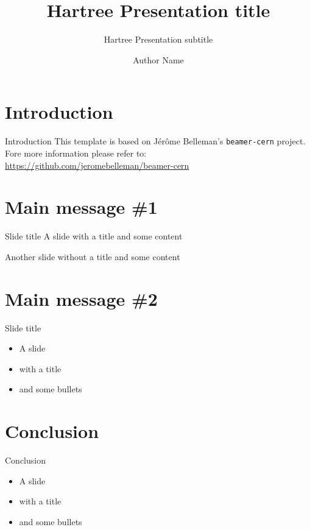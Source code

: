 \documentclass{beamer}
\author{Author Name}
\title{Hartree Presentation title}
\subtitle{Hartree Presentation subtitle}
\begin{document}
\frontcover

\frame{\titlepage}

\frame{\tableofcontents}

\section{Introduction}

\begin{frame}{Introduction}
This template is based on Jérôme Belleman's \texttt{beamer-cern} project. Fore more information please refer to: \small{\url{https://github.com/jeromebelleman/beamer-cern}}
\end{frame}

\section{Main message \#1}
\frame{\sectionpage}

\begin{frame}{Slide title}
A slide with a title and some content
\end{frame}

\begin{frame}
Another slide without a title and some content
\end{frame}

\section{Main message \#2}
\frame{\sectionpage}

\begin{frame}{Slide title}
	\begin{itemize}
		\item A slide
		\item with a title
		\item and some bullets
	\end{itemize}
\end{frame}

\section{Conclusion}

\begin{frame}{Conclusion}
	\begin{itemize}
		\item A slide
		\item with a title
		\item and some bullets
	\end{itemize}
\end{frame}

\backcover
\end{document}
